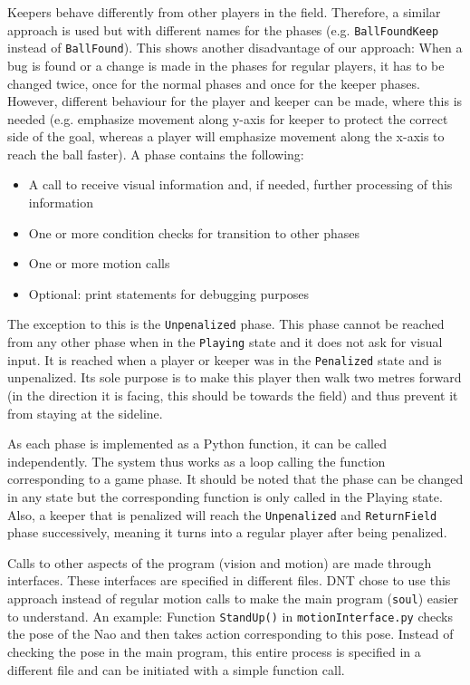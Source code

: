 \documentclass[11pt,a4paper,oneside]{article}
\begin{document}
Keepers behave differently from other players in the field. Therefore, a similar approach is used but with different names for the phases (e.g. \texttt{BallFoundKeep} instead of \texttt{BallFound}). This shows another disadvantage of our approach: When a bug is found or a change is made in the phases for regular players, it has to be changed twice, once for the normal phases and once for the keeper phases. However, different behaviour for the player and keeper can be made, where this is needed (e.g. emphasize movement along y-axis for keeper to protect the correct side of the goal, whereas a player will emphasize movement along the x-axis to reach the ball faster). A phase contains the following: 
\begin{itemize}
\item A call to receive visual information and, if needed, further processing of this information
\item One or more condition checks for transition to other phases
\item One or more motion calls
\item Optional: print statements for debugging purposes
\end{itemize}
The exception to this is the \texttt{Unpenalized} phase. This phase cannot be reached from any other phase when in the \texttt{Playing} state and it does not ask for visual input. It is reached when a player or keeper was in the \texttt{Penalized} state and is unpenalized. Its sole purpose is to make this player then walk two metres forward (in the direction it is facing, this should be towards the field) and thus prevent it from staying at the sideline. 

As each phase is implemented as a Python function, it can be called independently. The system thus works as a loop calling the function corresponding to a game phase. It should be noted that the phase can be changed in any state but the corresponding function is only called in the Playing state. Also, a keeper that is penalized will reach the \texttt{Unpenalized} and \texttt{ReturnField} phase successively, meaning it turns into a regular player after being penalized.  

Calls to other aspects of the program (vision and motion) are made through interfaces. These interfaces are specified in different files. DNT chose to use this approach instead of regular motion calls to make the main program (\texttt{soul}) easier to understand. An example: Function \texttt{StandUp()} in \texttt{motionInterface.py} checks the pose of the Nao and then takes action corresponding to this pose. Instead of checking the pose in the main program, this entire process is specified in a different file and can be initiated with a simple function call. 
\end{document}
